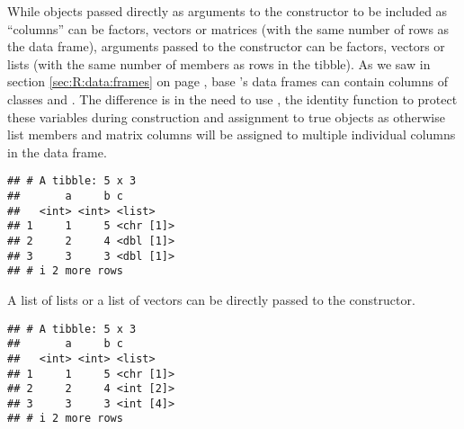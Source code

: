\documentclass[krantz2]{krantz}\usepackage{knitr}
\begin{document}
\begin{warningbox}
While objects passed directly as arguments to the  constructor to be included as ``columns'' can be factors, vectors or matrices (with the same number of rows as the data frame), arguments passed to the  constructor can be factors, vectors or lists (with the same number of members as rows in the tibble). As we saw in section \ref{sec:R:data:frames} on page \pageref{sec:R:data:frames}, base \Rlang's data frames can contain columns of classes  and . The difference is in the need to use , the identity function to protect these variables during construction and assignment to true  objects as otherwise list members and matrix columns will be assigned to multiple individual columns in the data frame.

\begin{knitrout}\footnotesize
{}\color{fgcolor}\begin{kframe}
\begin{alltt}
\hlstd{(} \hlstd{=} \hlopt{:}\hlstd{,}  \hlstd{=} \hlopt{:}\hlstd{,}  \hlstd{=} \hlstd{(}\hlstd{,} \hlstd{,} \hlstd{,} \hlstd{,} \hlstd{))}
\end{alltt}
\begin{verbatim}
## # A tibble: 5 x 3
##       a     b c        
##   <int> <int> <list>   
## 1     1     5 <chr [1]>
## 2     2     4 <dbl [1]>
## 3     3     3 <dbl [1]>
## # i 2 more rows
\end{verbatim}
\end{kframe}
\end{knitrout}

A list of lists or a list of vectors can be directly passed to the constructor.

\begin{knitrout}\footnotesize
{}\color{fgcolor}\begin{kframe}
\begin{alltt}
\hlstd{(} \hlstd{=} \hlopt{:}\hlstd{,}  \hlstd{=} \hlopt{:}\hlstd{,}  \hlstd{=} \hlstd{(}\hlstd{,} \hlopt{:}\hlstd{,} \hlopt{:}\hlstd{, letters[}\hlopt{:}\hlstd{], letters[}\hlopt{:}\hlstd{]))}
\end{alltt}
\begin{verbatim}
## # A tibble: 5 x 3
##       a     b c        
##   <int> <int> <list>   
## 1     1     5 <chr [1]>
## 2     2     4 <int [2]>
## 3     3     3 <int [4]>
## # i 2 more rows
\end{verbatim}
\end{kframe}
\end{knitrout}
\end{warningbox}
\end{document}
